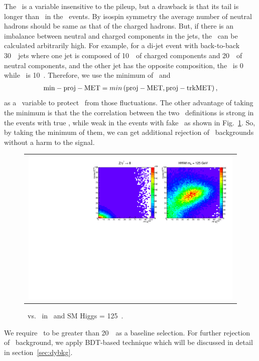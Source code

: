 The \trkmet\ is a variable insensitive to the pileup, 
but a drawback is that its tail is longer than \pfmet\ in the \dyll\ events. 
By isospin symmetry the average number of neutral hadrons should 
be same as that of the charged hadrons. But, if there is an imbalance between neutral 
and charged components in the jets, the \trkmet\ can be calculated arbitrarily high. 
For example, for a di-jet event with back-to-back 30~\GeV\ jets where one jet is composed 
of 10~\GeV\ of charged components and 20~\GeV\ of neutral components, and the other jet 
has the opposite composition, the \pfmet\ is 0 while \trkmet\ is 10~\GeV. 
Therefore, we use the minimum of \pfmet\ and \trkmet\, 
\begin{eqnarray} 
\mathrm{min-proj-MET} = min \left( \mathrm{proj-MET}, \mathrm{proj-trkMET} \right), 
\end{eqnarray} 
as a \met\ variable to protect \trkmet\ from those fluctuations. 
The other advantage of taking the minimum is that the the correlation 
between the two \met\ definitions is strong in the events with true \met, 
while weak in the events with fake \met\ as shown in Fig.~\ref{fig:2dmet}. 
So, by taking the minimum of them, we can get additional rejection 
of \dyll\ backgrounds without a harm to the signal.  
%
\begin{figure}[htp] 
\centering 
\begin{tabular}{c} 
\includegraphics[width=0.99\textwidth]{figures/2dmet.pdf} 
\end{tabular} 
\caption{\pmet\ vs. \ptrkmet\ in \dyll\ and SM Higgs \mHi = 125~\GeV.}
\label{fig:2dmet} 
\end{figure}  

We require \minpmet\ to be greater than 20~\GeV\ as a baseline selection. 
For further rejection of \dyll\ background, we apply BDT-based technique which will be 
discussed in detail in section~\ref{sec:dybkg}. 

